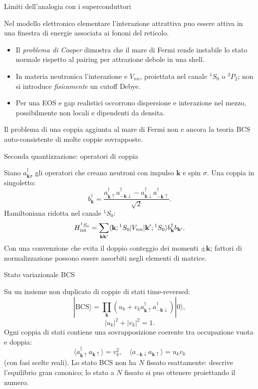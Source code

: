 \begin{frame}[t]{Limiti dell'analogia con i superconduttori}
\vspace*{3mm}
\small

Nel modello elettronico elementare l'interazione attrattiva puo essere attiva in una finestra di energie associata ai fononi del reticolo.
\begin{itemize}
\item Il \emph{problema di Cooper} dimostra che il mare di Fermi rende instabile lo stato normale rispetto al pairing per attrazione debole in una shell.
\item In materia neutronica l'interazione e $V_{nn}$, proiettata nel canale ${}^1S_0$ o ${}^3P_2$; non si introduce \emph{fisicamente} un cutoff Debye.
\item Per una EOS e gap realistici occorrono dispersione e interazione nel mezzo, possibilmente non locali e dipendenti da densita.
\end{itemize}
Il problema di una coppia aggiunta al mare di Fermi non e ancora la teoria BCS auto-consistente di molte coppie sovrapposte.
\end{frame}

\begin{frame}[t]{Seconda quantizzazione: operatori di coppia}
\vspace*{3mm}
\small

Siano $a_{\mathbf k\sigma}^{\dagger}$ gli operatori che creano neutroni con impulso $\mathbf k$ e spin $\sigma$.
Una coppia in singoletto:
\[
b_{\mathbf k}^{\dagger}=
\frac{a_{\mathbf k\uparrow}^{\dagger}a_{-\mathbf k\downarrow}^{\dagger}
-a_{\mathbf k\downarrow}^{\dagger}a_{-\mathbf k\uparrow}^{\dagger}}{\sqrt2}.
\]
Hamiltoniana ridotta nel canale ${}^1S_0$:
\[
H_{\rm int}^{{}^1S_0}
=\sum_{\mathbf k\mathbf k'}
\langle\mathbf k;{}^1S_0|V_{nn}|\mathbf k';{}^1S_0\rangle
 b_{\mathbf k}^{\dagger}b_{\mathbf k'}.
\]
Con una convenzione che evita il doppio conteggio dei momenti $\pm\mathbf k$; fattori di normalizzazione possono essere assorbiti negli elementi di matrice.
\end{frame}

\begin{frame}[t]{Stato variazionale BCS}
\vspace*{3mm}
\small

Su un insieme non duplicato di coppie di stati time-reversed:
\[
\boxed{|\mathrm{BCS}\rangle=
\prod_{\mathbf k}\left(u_k+v_k
 a_{\mathbf k\uparrow}^{\dagger}a_{-\mathbf k\downarrow}^{\dagger}\right)|0\rangle,}
\]
\[
|u_k|^2+|v_k|^2=1.
\]
Ogni coppia di stati contiene una sovrapposizione coerente tra occupazione vuota e doppia:
\[
\langle a_{\mathbf k\uparrow}^{\dagger}a_{\mathbf k\uparrow}\rangle=v_k^2,
\quad\langle a_{-\mathbf k\downarrow}a_{\mathbf k\uparrow}\rangle=u_kv_k
\]
(con fasi scelte reali).
Lo stato BCS non ha $N$ fissato esattamente: descrive l'equilibrio gran canonico; lo stato a $N$ fissato si puo ottenere proiettando il numero.
\end{frame}

